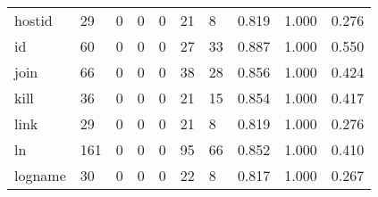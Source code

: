 \begin{longtable}{lp{2.0cm}p{2.0cm}p{2.0cm}p{2.0cm}p{2.0cm}p{2.0cm}p{2.0cm}p{2.0cm}p{2.0cm}}
hostid    &                     29 &                                             0 &                                            0 &                                           0 &                                           21 &                                          8 &                                0.819 &                                  1.000 &                                0.276 \\
id        &                     60 &                                             0 &                                            0 &                                           0 &                                           27 &                                         33 &                                0.887 &                                  1.000 &                                0.550 \\
join      &                     66 &                                             0 &                                            0 &                                           0 &                                           38 &                                         28 &                                0.856 &                                  1.000 &                                0.424 \\
kill      &                     36 &                                             0 &                                            0 &                                           0 &                                           21 &                                         15 &                                0.854 &                                  1.000 &                                0.417 \\
link      &                     29 &                                             0 &                                            0 &                                           0 &                                           21 &                                          8 &                                0.819 &                                  1.000 &                                0.276 \\
ln        &                    161 &                                             0 &                                            0 &                                           0 &                                           95 &                                         66 &                                0.852 &                                  1.000 &                                0.410 \\
logname   &                     30 &                                             0 &                                            0 &                                           0 &                                           22 &                                          8 &                                0.817 &                                  1.000 &                                0.267 \\

\end{longtable}

